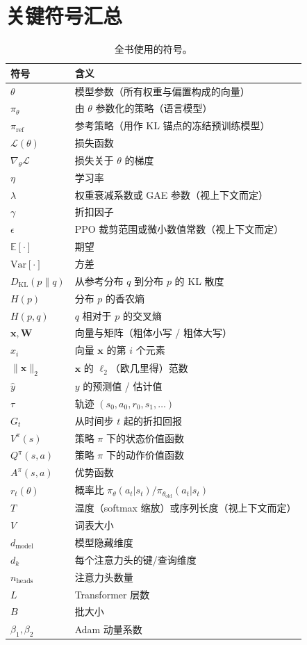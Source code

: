 \newpage
\section{关键符号汇总}
\label{app:notation}

\begin{table}[ht!]
\centering
\caption{全书使用的符号。}
\label{tab:notation}
\begin{tabular}{@{}lp{9cm}@{}}
\toprule
\textbf{符号} & \textbf{含义} \\
\midrule
$\theta$ & 模型参数（所有权重与偏置构成的向量） \\
$\pi_\theta$ & 由 $\theta$ 参数化的策略（语言模型） \\
$\pi_{\mathrm{ref}}$ & 参考策略（用作 KL 锚点的冻结预训练模型） \\
$\mathcal{L}(\theta)$ & 损失函数 \\
$\nabla_\theta \mathcal{L}$ & 损失关于 $\theta$ 的梯度 \\
$\eta$ & 学习率 \\
$\lambda$ & 权重衰减系数或 GAE 参数（视上下文而定） \\
$\gamma$ & 折扣因子 \\
$\epsilon$ & PPO 裁剪范围或微小数值常数（视上下文而定） \\
$\mathbb{E}[\cdot]$ & 期望 \\
$\mathrm{Var}[\cdot]$ & 方差 \\
$D_{\mathrm{KL}}(p \| q)$ & 从参考分布 $q$ 到分布 $p$ 的 KL 散度 \\
$H(p)$ & 分布 $p$ 的香农熵 \\
$H(p, q)$ & $q$ 相对于 $p$ 的交叉熵 \\
$\mathbf{x}, \mathbf{W}$ & 向量与矩阵（粗体小写 / 粗体大写） \\
$x_i$ & 向量 $\mathbf{x}$ 的第 $i$ 个元素 \\
$\|\mathbf{x}\|_2$ & $\mathbf{x}$ 的 $\ell_2$（欧几里得）范数 \\
$\hat{y}$ & $y$ 的预测值 / 估计值 \\
$\tau$ & 轨迹 $(s_0, a_0, r_0, s_1, \ldots)$ \\
$G_t$ & 从时间步 $t$ 起的折扣回报 \\
$V^\pi(s)$ & 策略 $\pi$ 下的状态价值函数 \\
$Q^\pi(s,a)$ & 策略 $\pi$ 下的动作价值函数 \\
$A^\pi(s,a)$ & 优势函数 \\
$r_t(\theta)$ & 概率比 $\pi_\theta(a_t|s_t) / \pi_{\theta_{\mathrm{old}}}(a_t|s_t)$ \\
$T$ & 温度（softmax 缩放）或序列长度（视上下文而定） \\
$V$ & 词表大小 \\
$d_{\mathrm{model}}$ & 模型隐藏维度 \\
$d_k$ & 每个注意力头的键/查询维度 \\
$n_{\mathrm{heads}}$ & 注意力头数量 \\
$L$ & Transformer 层数 \\
$B$ & 批大小 \\
$\beta_1, \beta_2$ & Adam 动量系数 \\
\bottomrule
\end{tabular}
\end{table}
